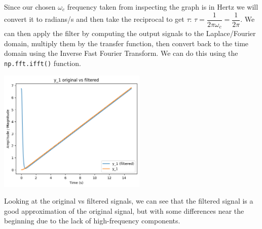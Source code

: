 \documentclass[11pt]{article}
\begin{document}
Since our chosen $\omega_c$ frequency taken from inspecting the graph is in Hertz we will convert it to radians/s and then take the reciprocal to get $\tau$: $\tau = \dfrac{1}{2\pi \omega_c} = \dfrac{1}{2\pi}$. We can then apply the filter by computing the output signals to the Laplace/Fourier domain, multiply them by the transfer function, then convert back to the time domain using the Inverse Fast Fourier Transform. We can do this using the \texttt{np.fft.ifft()} function.

\includegraphics[width=200pt]{p1_8.png}

Looking at the original vs filtered signals, we can see that the filtered signal is a good approximation of the original signal, but with some differences near the beginning due to the lack of high-frequency components.
\end{document}
